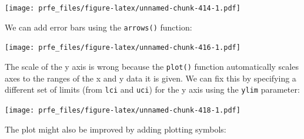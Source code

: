 \documentclass[12pt,a4paper]{book}
\newenvironment{Shaded}{\begin{snugshade}}{\end{snugshade}}
\newcommand{\DataTypeTok}[1]{\textcolor[rgb]{0.13,0.29,0.53}{#1}}
\newcommand{\DecValTok}[1]{\textcolor[rgb]{0.00,0.00,0.81}{#1}}
\newcommand{\FloatTok}[1]{\textcolor[rgb]{0.00,0.00,0.81}{#1}}
\newcommand{\KeywordTok}[1]{\textcolor[rgb]{0.13,0.29,0.53}{\textbf{#1}}}
\newcommand{\NormalTok}[1]{#1}
\newcommand{\OperatorTok}[1]{\textcolor[rgb]{0.81,0.36,0.00}{\textbf{#1}}}
\newcommand{\StringTok}[1]{\textcolor[rgb]{0.31,0.60,0.02}{#1}}
\theoremstyle{definition}
\theoremstyle{definition}
\theoremstyle{definition}
\theoremstyle{remark}
\begin{document}
\texttt{[image: prfe\_files/figure-latex/unnamed-chunk-414-1.pdf]}

We can add error bars using the \texttt{arrows()} function:

\begin{Shaded}
\end{Shaded}

\texttt{[image: prfe\_files/figure-latex/unnamed-chunk-416-1.pdf]}

The scale of the y axis is wrong because the \texttt{plot()} function
automatically scales axes to the ranges of the x and y data it is given.
We can fix this by specifying a different set of limits (from
\texttt{lci} and \texttt{uci}) for the y axis using the \texttt{ylim}
parameter:

\begin{Shaded}
\end{Shaded}

\texttt{[image: prfe\_files/figure-latex/unnamed-chunk-418-1.pdf]}

The plot might also be improved by adding plotting symbols:

\begin{Shaded}
\end{Shaded}
\end{document}
